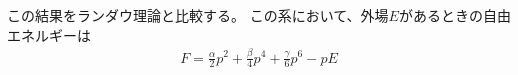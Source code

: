 \documentclass[11pt,dvipdfmx,a4paper]{jsarticle}
\begin{document}
この結果をランダウ理論と比較する。
この系において、外場\(E\)があるときの自由エネルギーは
\begin{align}
    F = \frac{\alpha}{2} p^2 + \frac{\beta}{4} p^4 +\frac{\gamma}{6} p^6-pE
\end{align}



\end{document}
